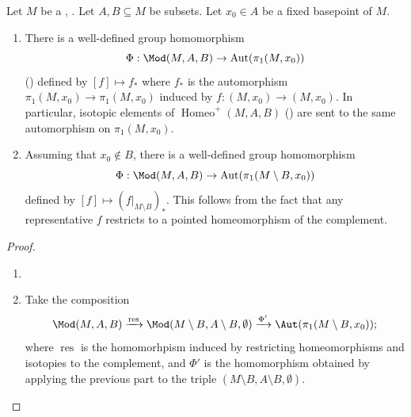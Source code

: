 \begin{theorem} \label{theorem:mapping_class_group_on_a_connected_oriented_manifold_with_respect_to_subsets_maps_to_automorphism_group_of_fundamental_group}
    Let $M$ be a ,  . Let $A,B \subseteq M$ be subsets. Let $x_0 \in A$ be a fixed basepoint of $M$. 

    \begin{enumerate}
        \item 
        There is a well-defined group homomorphism
        $$\Phi: \Mod(M,A,B) \to \operatorname{Aut}(\pi_1(M,x_0))$$ 
        ()
        defined by $[f] \mapsto f_*$ where $f_*$ is the automorphism $\pi_1(M,x_0) \to \pi_1(M,x_0)$ induced by $f: (M,x_0) \to (M,x_0)$. In particular, isotopic elements of $\operatorname{Homeo}^+(M,A,B)$ () are sent to the same automorphism on $\pi_1(M,x_0)$.

        \item Assuming that $x_0 \not\in B$, there is a well-defined group homomorphism
        $$\Phi: \Mod(M,A,B) \to \operatorname{Aut}(\pi_1(M \setminus B,x_0))$$ 
        defined by $[f] \mapsto (f|_{M \setminus B})_*$. This follows from the fact that any representative $f$ restricts to a pointed homeomorphism of the complement.
    \end{enumerate}
\end{theorem}
\begin{proof}

    \begin{enumerate}
        \item  \TODO{}
        \item  Take the composition 
        $$\Mod(M,A,B) \xrightarrow{\operatorname{res}} \Mod(M \setminus B, A \setminus B, \emptyset) \xrightarrow{\Phi'} \Aut(\pi_1(M \setminus B, x_0));$$
        where $\operatorname{res}$ is the homomorhpism induced by restricting homeomorphisms and isotopies to the complement, and $\Phi'$ is the homomorphism obtained by applying the previous part to the triple $(M \setminus B, A \setminus B, \emptyset)$.
    \end{enumerate}

\end{proof}